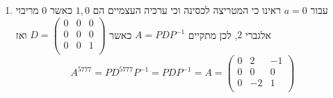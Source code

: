 \documentclass[12pt, a4paper]{article}
\begin{document}
\begin{enumerate}
\begin{enumerate}
\begin{itemize}
$1$
ואז גיאומטרי
$1$.
הערך העצמי
$\lambda=0$
הוא מריבוי אלגברי
$2$
אז נבדוק מהו הריבוי הגיאומטרי שלו, בעזרת מציאת המרחב העצמי שלו:
\begin{align*}
    N(0\cdot I_3-A)=N\begin{pmatrix}
        1&-2&1\\
        0&1&0\\
        -1&2&-1\\
    \end{pmatrix}
\end{align*}
ולאחר דירוג המטריצה הזו נקבל את הדירוג הקנוני
$\begin{pmatrix}
    1&0&1\\
    0&1&0\\
    0&0&0\\
\end{pmatrix}$
מה שאומר כי מימד מרחב הפתרונות יהיה
$1$
ואז הריבוי הגיאומטרי שונה מהאלגברי והמטריצה
$A$
אינה לכסינה.
\end{itemize}
        \item 
        עבור
        $a=0$
        ראינו כי המטריצה לכסינה וכי ערכיה העצמיים הם
        $1,0$
        כאשר
        $0$
        מריבוי אלגברי
        $2$,
        לכן מתקיים
        $A=PDP^{-1}$
        כאשר
        $D=\begin{pmatrix}
            0&0&0\\
            0&0&0\\
            0&0&1\\
        \end{pmatrix}$
        ואז
        $$A^{5777}=PD^{5777}P^{-1}=PDP^{-1}=A=
        \begin{pmatrix}
        0&2&-1\\
        0&0&0\\
        0&-2&1\\
    \end{pmatrix}$$
    \end{enumerate}
    \pagebreak \ 
    \ 
    



\end{enumerate}
\end{document}

